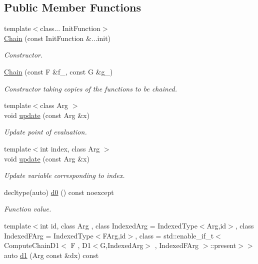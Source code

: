 \subsection*{Public Member Functions}
\begin{DoxyCompactItemize}
\item 
{\footnotesize template$<$class... Init\+Function$>$ }\\\hyperlink{structFunG_1_1MathematicalOperations_1_1Chain_a11bbc19be4ace14904de0be6d703fb1f}{Chain} (const Init\+Function \&...init)
\begin{DoxyCompactList}\small\item\em Constructor. \end{DoxyCompactList}\item 
\hyperlink{structFunG_1_1MathematicalOperations_1_1Chain_a3167b6304026eb0bd92e57d0dd0087e0}{Chain} (const F \&f\+\_\+, const G \&g\+\_\+)
\begin{DoxyCompactList}\small\item\em Constructor taking copies of the functions to be chained. \end{DoxyCompactList}\item 
{\footnotesize template$<$class Arg $>$ }\\void \hyperlink{structFunG_1_1MathematicalOperations_1_1Chain_adb7f63859ef7dbdd08b0908c3a17794d}{update} (const Arg \&x)
\begin{DoxyCompactList}\small\item\em Update point of evaluation. \end{DoxyCompactList}\item 
{\footnotesize template$<$int index, class Arg $>$ }\\void \hyperlink{structFunG_1_1MathematicalOperations_1_1Chain_aa41d754e68072e0a9f1460da79f9913e}{update} (const Arg \&x)
\begin{DoxyCompactList}\small\item\em Update variable corresponding to index. \end{DoxyCompactList}\item 
decltype(auto) \hyperlink{structFunG_1_1MathematicalOperations_1_1Chain_a96de3ba6edeb9decba4c04ad9ddb48ff}{d0} () const noexcept
\begin{DoxyCompactList}\small\item\em Function value. \end{DoxyCompactList}\item 
{\footnotesize template$<$int id, class Arg , class Indexed\+Arg  = Indexed\+Type$<$\+Arg,id$>$, class Indexed\+F\+Arg  = Indexed\+Type$<$\+F\+Arg,id$>$, class  = std\+::enable\+\_\+if\+\_\+t$<$ Compute\+Chain\+D1$<$ F , D1$<$\+G,\+Indexed\+Arg$>$ , Indexed\+F\+Arg $>$\+::present$>$$>$ }\\auto \hyperlink{structFunG_1_1MathematicalOperations_1_1Chain_adfe741dee89257258b39df846fd16cf7}{d1} (Arg const \&dx) const 

\end{DoxyCompactItemize}
